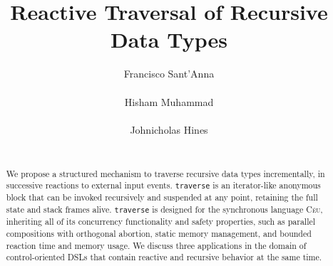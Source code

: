 \documentclass{sig-alternate}
\newcommand{\CEU}{\textsc{C\'{e}u}\xspace}
\newcommand{\code}[1] {{\small{\texttt{#1}}}}
\begin{document}
\title{Reactive Traversal of Recursive Data Types}

\author{
\alignauthor
Francisco Sant'Anna \\
     \\
\alignauthor
Hisham Muhammad \\
     \\
\alignauthor
Johnicholas Hines \\
     \\
}

\maketitle
\begin{abstract}
We propose a structured mechanism to traverse recursive data types 
incrementally, in successive reactions to external input events.
\code{traverse} is an iterator-like anonymous block that can be invoked 
recursively and suspended at any point, retaining the full state and stack 
frames alive.
\code{traverse} is designed for the synchronous language \CEU, inheriting all 
of its concurrency functionality and safety properties, such as parallel 
compositions with orthogonal abortion, static memory management, and bounded 
reaction time and memory usage.
We discuss three applications in the domain of control-oriented DSLs that 
contain reactive and recursive behavior at the same time.

\end{abstract}
\end{document}
